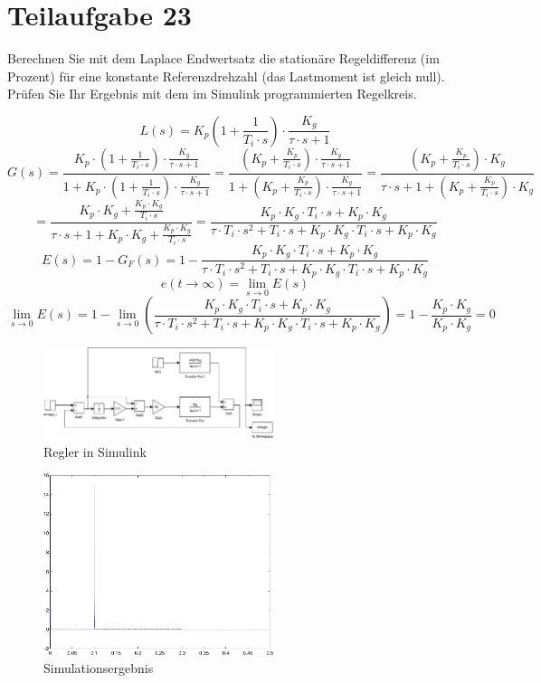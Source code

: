 \section{Teilaufgabe 23}
\begin{aufgabe}
    Berechnen Sie mit dem Laplace Endwertsatz die stationäre Regeldifferenz 
    (im Prozent) für eine konstante Referenzdrehzahl (das Lastmoment ist 
    gleich null).  Prüfen Sie Ihr Ergebnis mit dem im Simulink programmierten 
    Regelkreis.
\end{aufgabe}
\[ L(s) = K_p \left(1 + \frac{1}{T_i \cdot s}\right) 
    \cdot \frac{K_g}{\tau \cdot s + 1} \]
\[ G(s) = \frac{K_p \cdot \left(1 + \frac{1}{T_i \cdot s}\right) 
        \cdot \frac{K_g}{\tau \cdot s + 1}}
        {1 + K_p \cdot \left(1 + \frac{1}{T_i \cdot s}\right) 
        \cdot \frac{K_g} {\tau \cdot s + 1}}
    = \frac{\left(K_p + \frac{K_p}{T_i \cdot s}\right) 
        \cdot \frac{K_g}{\tau \cdot s + 1}}
        {1 + \left(K_p + \frac{K_p}{T_i \cdot s}\right) 
        \cdot \frac{K_g} {\tau \cdot s + 1}}
    = \frac{\left(K_p + \frac{K_p}{T_i \cdot s}\right) 
        \cdot K_g}
        {\tau \cdot s + 1 + \left(K_p + \frac{K_p}{T_i \cdot s}\right) 
        \cdot K_g}
\]
\[  = \frac{K_p \cdot K_g + \frac{K_p \cdot K_g}{T_i \cdot s}}
        {\tau \cdot s + 1 + K_p \cdot K_g + \frac{K_p \cdot K_g}{T_i \cdot s}}
    = \frac{K_p \cdot K_g \cdot T_i \cdot s + K_p \cdot K_g}
        {\tau \cdot T_i \cdot s^2 + T_i \cdot s 
        + K_p \cdot K_g \cdot T_i \cdot s + K_p \cdot K_g}
\]
\[ E(s) = 1 - G_F(s) = 1 - \frac{K_p \cdot K_g \cdot T_i \cdot s + K_p \cdot K_g}
        {\tau \cdot T_i \cdot s^2 + T_i \cdot s
        + K_p \cdot K_g \cdot T_i \cdot s + K_p \cdot K_g}
\]
\[ e(t \to \infty) = \lim\limits_{s \to 0} E(s) \]
\[ \lim\limits_{s \to 0} E(s) = 1 - \lim\limits_{s \to 0} 
        \left(\frac{K_p \cdot K_g \cdot T_i \cdot s + K_p \cdot K_g}
        {\tau \cdot T_i \cdot s^2 + T_i \cdot s 
        + K_p \cdot K_g \cdot T_i \cdot s + K_p \cdot K_g}\right)
    = 1 - \frac{K_p \cdot K_g}{K_p \cdot K_g}
    = 0
\]
\begin{figure}[h!]
    \centering
    \includegraphics[width=0.6\textwidth]{23/regler_pi_diff.pdf}
    \caption{Regler in Simulink}
    \label{fig:23}
\end{figure}
\begin{figure}[h!]
    \centering
    \includegraphics[width=0.6\textwidth]{23/regler_pi_diff_plot.pdf}
    \caption{Simulationsergebnis}
    \label{fig:23plot}
\end{figure}

